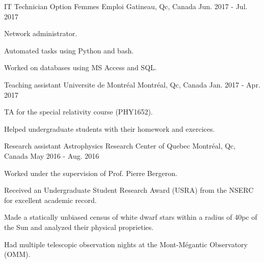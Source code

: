 \begin{cventries}
  \cventry
    {IT Technician}
    {Option Femmes Emploi}
    {Gatineau, Qc, Canada}
    {Jun. 2017 - Jul. 2017}
    {
      \begin{cvitems}
        \item {Network administrator.}
        \item {Automated tasks using Python and bash.}
        \item {Worked on databases using MS Access and SQL.}
      \end{cvitems}
    }
  \cventry
    {Teaching assistant}
    {Universite de Montr\'eal}
    {Montr\'eal, Qc, Canada}
    {Jan. 2017 - Apr. 2017}
    {
      \begin{cvitems}
        \item {TA for the special relativity course (PHY1652).}
        \item {Helped undergraduate students with their homework and exercices.}
      \end{cvitems}
    }
  \cventry
    {Research assistant}
    {Astrophysics Research Center of Quebec}
    {Montr\'eal, Qc, Canada}
    {May 2016 - Aug. 2016}
    {
      \begin{cvitems}
        \item {Worked under the supervision of Prof. Pierre Bergeron.}
        \item {Received an Undergraduate Student Research Award (USRA) from the NSERC for excellent academic record.}
        \item {Made a statically unbiased census of white dwarf stars within a radius of 40pc of the Sun and analyzed their physical proprieties.}
        \item {Had multiple telescopic observation nights at the Mont-M\'egantic Observatory (OMM).}
      \end{cvitems}
    }

\end{cventries}
